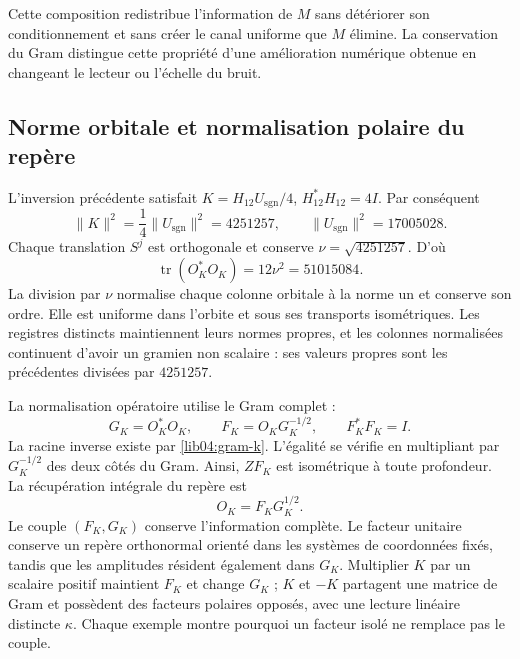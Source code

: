 Cette composition redistribue l’information de \(M\) sans détériorer
son conditionnement et sans créer le canal uniforme que \(M\) élimine.
La conservation du Gram distingue cette propriété d’une amélioration
numérique obtenue en changeant le lecteur ou l’échelle du bruit.

\subsection{Norme orbitale et normalisation polaire du repère}
\label{lib04:normalizacion}

L’inversion précédente satisfait
\(K=H_{12}U_{\mathrm{sgn}}/4\),
\(H_{12}^*H_{12}=4I\). Par conséquent
\begin{equation}
 \|K\|^2=\frac14\|U_{\mathrm{sgn}}\|^2=4251257,
 \qquad \|U_{\mathrm{sgn}}\|^2=17005028.
 \label{lib04:norma-k}
\end{equation}
Chaque translation \(S^j\) est orthogonale et conserve
\(\nu=\sqrt{4251257}\). D’où
\begin{equation}
 \operatorname{tr}(O_K^*O_K)=12\nu^2=51015084.
 \label{lib04:traza-marco}
\end{equation}
La division par \(\nu\) normalise chaque colonne orbitale à la norme
un et conserve son ordre. Elle est uniforme dans l’orbite et sous ses
transports isométriques. Les registres distincts maintiennent leurs normes
propres, et les colonnes normalisées continuent d’avoir un gramien
non scalaire : ses valeurs propres sont les précédentes divisées par
\(4251257\).

La normalisation opératoire utilise le Gram complet :
\begin{equation}
 G_K=O_K^*O_K,\qquad
 F_K=O_KG_K^{-1/2},\qquad
 F_K^*F_K=I.
 \label{lib04:polar}
\end{equation}
La racine inverse existe par \eqref{lib04:gram-k}. L’égalité se
vérifie en multipliant par \(G_K^{-1/2}\) des deux côtés du Gram.
Ainsi, \(ZF_K\) est isométrique à toute profondeur.
La récupération intégrale du repère est
\begin{equation}
 O_K=F_KG_K^{1/2}.
 \label{lib04:polar-inversa}
\end{equation}
Le couple \((F_K,G_K)\) conserve l’information complète.
Le facteur unitaire conserve un repère orthonormal orienté dans les
systèmes de coordonnées fixés, tandis que les amplitudes résident également dans
\(G_K\). Multiplier \(K\) par un scalaire positif maintient
\(F_K\) et change \(G_K\) ; \(K\) et \(-K\) partagent
une matrice de Gram et possèdent des facteurs polaires opposés, avec une lecture linéaire distincte
\(\kappa\). Chaque exemple montre pourquoi un facteur isolé ne
remplace pas le couple.

